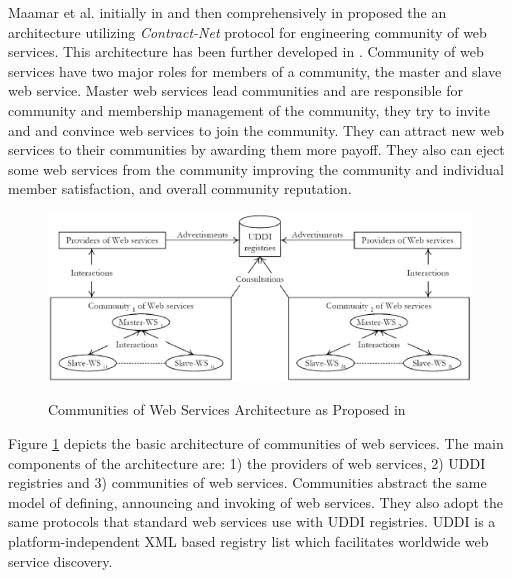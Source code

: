         Maamar et al. initially in \cite{conf/webist/MaamarLBTS07} and then comprehensively in \cite{DBLP:journals/ijebr/MaamarSTBB09} proposed the an architecture
        utilizing \emph{Contract-Net} protocol for engineering community of web services.
        This architecture has been further developed in \cite{conf/IEEEscc/BenharrefSBB11, conf/IEEEscc/KhosravifarBMMT10, conf/aina/LimTM11, CSTintercommunity}.
        Community of web services have two major roles for members of a community, the master and slave web service.
        Master web services lead communities and are responsible for community and membership management of the community, they try to invite and and convince web services to join the
        community. They can attract new web services to their communities by awarding them more payoff. They also can eject some web services from the community improving the
        community and individual member satisfaction, and overall community reputation.

        \begin{figure}
            \begin{center}
            \includegraphics[width=16cm]{Figures/wsarch.eps}\label{wsarch}
            \caption{Communities of Web Services Architecture as Proposed in \cite{DBLP:journals/ijebr/MaamarSTBB09}}
            \end{center}
        \end{figure}

        Figure \ref{wsarch} depicts the basic architecture of communities of web services. The main components of the architecture are: 1) the providers of web services,
        2) UDDI registries and 3) communities of web services. Communities abstract the same model of defining, announcing and invoking of web services. They also adopt the same protocols that standard web services use with UDDI registries. UDDI is a platform-independent XML based registry list which facilitates worldwide web service discovery.

